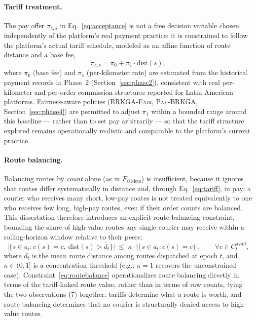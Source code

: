 \documentclass[12pt,a4paper]{report}
\begin{document}
\paragraph{Tariff treatment.} The pay offer $\pi_{c,s}$ in Eq.~\eqref{eq:acceptance} is not a free decision variable chosen independently of the platform's real payment practice: it is constrained to follow the platform's actual tariff schedule, modeled as an affine function of route distance and a base fee,
\begin{equation}
    \pi_{c,s} = \pi_0 + \pi_1 \cdot \text{dist}(s),
    \label{eq:tariff}
\end{equation}
where $\pi_0$ (base fee) and $\pi_1$ (per-kilometer rate) are estimated from the historical payment records in Phase~2 (Section~\ref{sec:phase2}), consistent with real per-kilometer and per-order commission structures reported for Latin American platforms. Fairness-aware policies (\textsc{BRKGA-Fair}, \textsc{Pay-BRKGA}, Section~\ref{sec:phase4}) are permitted to adjust $\pi_1$ within a bounded range around this baseline --- rather than to set pay arbitrarily --- so that the tariff structure explored remains operationally realistic and comparable to the platform's current practice.

\paragraph{Route balancing.} Balancing routes by \emph{count} alone (as in $F_{\text{Orders}}$) is insufficient, because it ignores that routes differ systematically in distance and, through Eq.~\eqref{eq:tariff}, in pay: a courier who receives many short, low-pay routes is not treated equivalently to one who receives few long, high-pay routes, even if their order counts are balanced. This dissertation therefore introduces an explicit route-balancing constraint, bounding the share of high-value routes any single courier may receive within a rolling-horizon window relative to their peers:
\begin{equation}
    \bigl|\{s \in a_t : c(s) = c,\ \text{dist}(s) > \bar{d}_t\}\bigr| \;\leq\; \kappa \cdot |\{s \in a_t : c(s) = c\}|,
    \qquad \forall c \in C_t^{\text{avail}},
    \label{eq:routebalance}
\end{equation}
where $\bar{d}_t$ is the mean route distance among routes dispatched at epoch $t$, and $\kappa \in (0,1]$ is a concentration threshold (e.g., $\kappa = 1$ recovers the unconstrained case). Constraint~\eqref{eq:routebalance} operationalizes route balancing directly in terms of the tariff-linked route value, rather than in terms of raw counts, tying the two observations (7) together: tariffs determine what a route is worth, and route balancing determines that no courier is structurally denied access to high-value routes.
\end{document}
